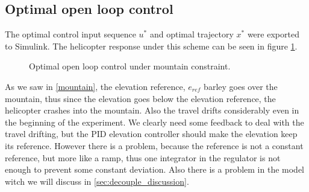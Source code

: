 \subsection{Optimal open loop control}
The optimal control input sequence $u^*$ and optimal trajectory $x^*$ were exported to Simulink. The helicopter response under this scheme can be seen in figure \ref{fig:two_dim_open_loop}.
\begin{figure}[H] 
        \centering
        \setlength{\figureheight}{6cm}
        \setlength{\figurewidth}{10cm}
        
        \caption{Optimal open loop control under mountain constraint.} 
\label{fig:two_dim_open_loop} 
\end{figure}
As we saw in \cref{mountain}, the elevation reference, $e_{ref}$ barley goes over the mountain, thus since the elevation goes below the elevation reference, the helicopter crashes into the mountain. Also the travel drifts considerably even in the beginning of the experiment. We clearly need some feedback to deal with the travel drifting, but the PID elevation controller should make the elevation keep its reference. However there is a problem, because the reference is not a constant reference, but more like a ramp, thus one integrator in the regulator is not enough to prevent some constant deviation. Also there is a problem in the model witch we will discuss in \cref{sec:decouple_discussion}.  

